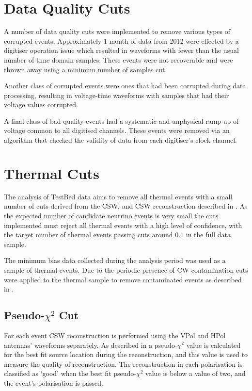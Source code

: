 \section{Data Quality Cuts}
\label{sec:Analysis:Data-Quality-Cuts}

A number of data quality cuts were implemented to remove various types of corrupted events. Approximately 1 month of data from 2012 were effected by a digitiser operation issue which resulted in waveforms with fewer than the usual number of time domain samples. These events were not recoverable and were thrown away using a minimum number of samples cut.

Another class of corrupted events were ones that had been corrupted during data processing, resulting in voltage-time waveforms with samples that had their voltage values corrupted.

A final class of bad quality events had a systematic and unphysical ramp up of voltage common to all digitised channels. These events were removed via an algorithm that checked the validity of data from each digitiser's clock channel.


\section{Thermal Cuts}
\label{sec:Analysis:Thermal-Cuts}

The analysis of TestBed data aims to remove all thermal events with a small number of cuts derived from the CSW, and CSW reconstruction described in . As the expected number of candidate neutrino events is very small the cuts implemented must reject all thermal events with a high level of confidence, with the target number of thermal events passing cuts around $0.1$ in the full data sample.

The minimum bias data collected during the analysis period was used as a sample of thermal events. Due to the periodic presence of CW contamination cuts were applied to the thermal sample to remove contaminated events as described in . 

\subsection{Pseudo-$\chi^{2}$ Cut}
\label{sec:Analysis:Thermal-Cuts:Pseudo-ChiSq}

For each event CSW reconstruction is performed using the VPol and HPol antennas' waveforms separately. As described in  a pseudo-$\chi^{2}$ value is calculated for the best fit source location during the reconstruction, and this value is used to measure the quality of reconstruction. The reconstruction in each polarisation is classified as `good' when the best fit pseudo-$\chi^{2}$ value is below a value of two, and the event's polarisation is passed.

